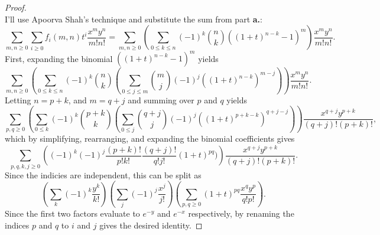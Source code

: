 \documentclass{article}
\begin{document}
\begin{proof} \text{} \\
  I'll use Apoorva Shah's technique and substitute the sum from part
  \textbf{a.}:\[
    \sum_{m, n \geq 0} \sum_{i \geq 0} f_i(m,n)t^i\frac{x^m y^n}{m!n!}
    = \sum_{m, n \geq 0} \left(
      \sum_{0\leq k \leq n} (-1)^k \binom nk ((1 + t)^{n - k} - 1)^m
    \right)\frac{x^m y^n}{m!n!}.
  \]
  First, expanding the binomial $((1 + t)^{n - k} - 1)^m$ yields \[
  \sum_{m, n \geq 0} \left(
    \sum_{0\leq k \leq n} (-1)^k \binom nk
    \left(
    \sum_{0\leq j\leq m} \binom{m}{j}(-1)^j((1 + t)^{n - k})^{m - j}
    \right)
  \right)\frac{x^m y^n}{m!n!}.
  \]
  Letting $n = p + k$, and $m = q + j$ and summing over $p$ and $q$ yields \[
  \sum_{p, q \geq 0} \left(
    \sum_{0\leq k} (-1)^k \binom{p + k}{k}
    \left(
    \sum_{0\leq j} \binom{q + j}{j}(-1)^j((1 + t)^{p + k - k})^{q + j - j}
    \right)
  \right)\frac{x^{q + j} y^{p + k}}{(q + j)!(p + k)!},
  \] which by simplifying, rearranging, and expanding the binomial coefficients gives \[
  \sum_{p, q, k, j \geq 0} \left(
    (-1)^k(-1)^j \frac{(p + k)!}{p!k!}
    \frac{(q + j)!}{q!j!}(1 + t)^{pq})
  \right)\frac{x^{q + j} y^{p + k}}{(q + j)!(p + k)!}.
  \] Since the indicies are independent, this can be split as \[
    \left(
      \sum_k (-1)^k\frac{y^k}{k!}
    \right)
    \left(
      \sum_j (-1)^j\frac{x^j}{j!}
    \right)
    \left(
      \sum_{p, q \geq 0} (1 + t)^{pq}\frac{x^qy^p}{q!p!}
    \right).
  \] Since the first two factors evaluate to $e^{-y}$ and $e^{-x}$ respectively,
  by renaming the indices $p$ and $q$ to $i$ and $j$ gives the desired identity.
\end{proof}
\end{document}

